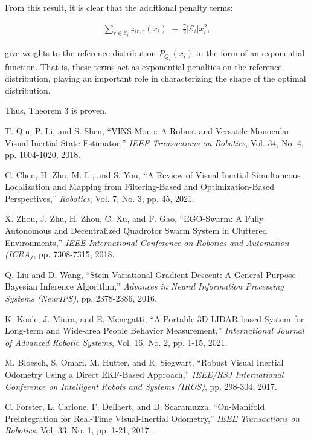 \documentclass[a4paper,fleqn,10pt,twocolumn]{SICE_ISCS}
\begin{document}
From this result, it is clear that the additional penalty terms:

\begin{equation}
\begin{aligned}
\sum_{r \in {\mathcal{E}}_i} z_{ir,r}(x_i) \;+\; \frac{\gamma}{2}|{\mathcal{E}}_i|x_i^2,
\end{aligned}
\end{equation}

give weights to the reference distribution $P_{Q_i}(x_i)$ in the form of an exponential function. That is, these terms act as exponential penalties on the reference distribution, playing an important role in characterizing the shape of the optimal distribution.

Thus, Theorem 3 is proven.

\begin{thebibliography}{99}
 T. Qin, P. Li, and S. Shen, ``VINS-Mono: A Robust and Versatile Monocular Visual-Inertial State Estimator,'' {\it IEEE Transactions on Robotics}, Vol. 34, No. 4, pp. 1004-1020, 2018.

 C. Chen, H. Zhu, M. Li, and S. You, ``A Review of Visual-Inertial Simultaneous Localization and Mapping from Filtering-Based and Optimization-Based Perspectives,'' {\it Robotics}, Vol. 7, No. 3, pp. 45, 2021.

 X. Zhou, J. Zhu, H. Zhou, C. Xu, and F. Gao, ``EGO-Swarm: A Fully Autonomous and Decentralized Quadrotor Swarm System in Cluttered Environments,'' {\it IEEE International Conference on Robotics and Automation (ICRA)}, pp. 7308-7315, 2018.

 Q. Liu and D. Wang, ``Stein Variational Gradient Descent: A General Purpose Bayesian Inference Algorithm,'' {\it Advances in Neural Information Processing Systems (NeurIPS)}, pp. 2378-2386, 2016.

 K. Koide, J. Miura, and E. Menegatti, ``A Portable 3D LIDAR-based System for Long-term and Wide-area People Behavior Measurement,'' {\it International Journal of Advanced Robotic Systems}, Vol. 16, No. 2, pp. 1-15, 2021.

 M. Bloesch, S. Omari, M. Hutter, and R. Siegwart, ``Robust Visual Inertial Odometry Using a Direct EKF-Based Approach,'' {\it IEEE/RSJ International Conference on Intelligent Robots and Systems (IROS)}, pp. 298-304, 2017.

 C. Forster, L. Carlone, F. Dellaert, and D. Scaramuzza, ``On-Manifold Preintegration for Real-Time Visual-Inertial Odometry,'' {\it IEEE Transactions on Robotics}, Vol. 33, No. 1, pp. 1-21, 2017.


\end{thebibliography}
\end{document}
